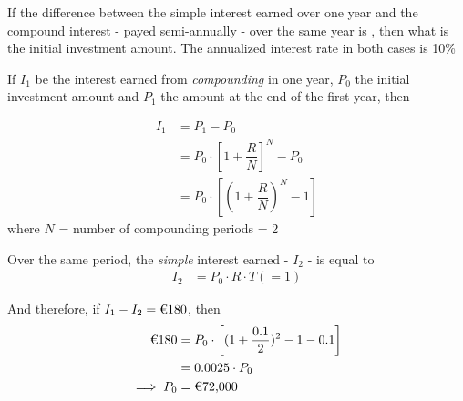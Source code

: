

\question[3]   If the difference between the simple interest earned over one year
and the compound interest - payed semi-annually - over the same year is ,
then what is the initial investment amount. The annualized interest rate in both cases is 10\% 


\ifprintanswers
\fi 

\begin{solution}[\fullpage]
	If $I_1$ be the interest earned from \emph{compounding} in one year, $P_0$ the 
	initial investment amount and $P_1$ the amount at the end of the first year, then
	
	\begin{align}
		I_1 &= P_1 - P_0 \\ 
		    &= P_0\cdot\left[ 1+\dfrac{R}{N}\right]^N - P_0 \\
		    &= P_0\cdot\left[ (1+\dfrac{R}{N})^N - 1 \right]
	\end{align}
	where $N$ = number of compounding periods = 2
	
	Over the same period, the \emph{simple} interest earned - $I_2$ - is equal to
	\begin{align}
		I_2 &= P_0\cdot R\cdot T(=1)
    \end{align}
    
    And therefore, if $I_1-I_2 = \text{\texteuro 180}$, then 
    \begin{align}
    	\text{\texteuro 180} &= P_0\cdot\left[ (1+\dfrac{0.1}{2})^2 - 1 - 0.1\right] \\
    	                     &= 0.0025\cdot P_0 \\
    	\implies P_0 &= \text{\texteuro 72,000}
    \end{align}
\end{solution}
\ifprintanswers\begin{codex}\end{codex}\fi
